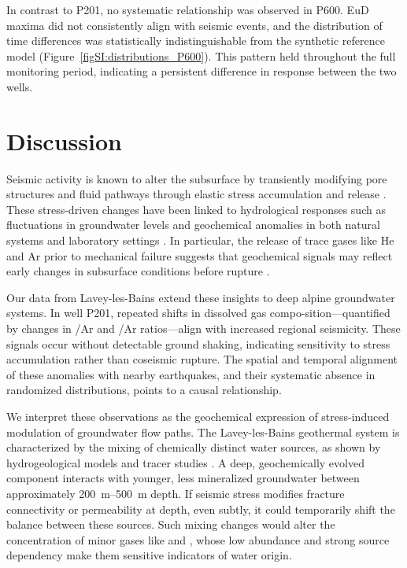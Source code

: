 In contrast to P201, no systematic relationship was observed in P600.
EuD maxima did not consistently align with seismic events, and the distribution of time differences was statistically indistinguishable from the synthetic reference model (Figure~\ref{figSI:distributions_P600}).
This pattern held throughout the full monitoring period, indicating a persistent difference in response between the two wells.

\section{Discussion}
Seismic activity is known to alter the subsurface by transiently modifying pore structures and fluid pathways through elastic stress accumulation and release \citep{nakagomi2021stress, liu2024opposite}.
These stress-driven changes have been linked to hydrological responses such as fluctuations in groundwater levels and geochemical anomalies in both natural systems and laboratory settings \citep{rutter2016aquifer, bauer2016release}.
In particular, the release of trace gases like He and Ar prior to mechanical failure suggests that geochemical signals may reflect early changes in subsurface conditions before rupture \citep{roques2020helium}.

Our data from Lavey-les-Bains extend these insights to deep alpine groundwater systems.
In well P201, repeated shifts in dissolved gas compo-sition---quantified by changes in /Ar and /Ar ratios---align with increased regional seismicity.
These signals occur without detectable ground shaking, indicating sensitivity to stress accumulation rather than coseismic rupture.
The spatial and temporal alignment of these anomalies with nearby earthquakes, and their systematic absence in randomized distributions, points to a causal relationship.

We interpret these observations as the geochemical expression of stress-induced modulation of groundwater flow paths.
The Lavey-les-Bains geothermal system is characterized by the mixing of chemically distinct water sources, as shown by hydrogeological models and tracer studies \citep{sonney2009numerical, giroud2025microbio}.
A deep, geochemically evolved component interacts with younger, less mineralized groundwater between approximately \SIrange{200}{500}{\metre} depth.
If seismic stress modifies fracture connectivity or permeability at depth, even subtly, it could temporarily shift the balance between these sources.
Such mixing changes would alter the concentration of minor gases like  and , whose low abundance and strong source dependency make them sensitive indicators of water origin.


